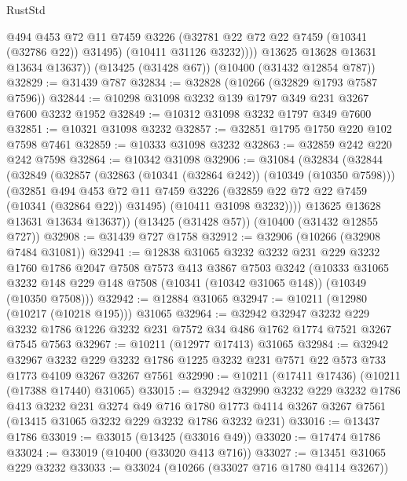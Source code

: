 \begin{lexlean}{RustStd}
\begin{coremodule}
              @494
              @453
              @72
              @11
              @7459
              @3226
              (@32781 @22 @72 @22 @7459 (@10341 (@32786 @22)) @31495)
              (@10411 @31126 @3232))))
        @13625
        @13628
        @13631
        @13634
        @13637))
    (@13425 (@31428 @67))
    (@10400 (@31432 @12854 @787))
@32829 := @31439 @787
@32834 := @32828 (@10266 (@32829 @1793 @7587 @7596))
@32844 := @10298 @31098 @3232 @139 @1797 @349 @231 @3267 @7600 @3232 @1952
@32849 := @10312 @31098 @3232 @1797 @349 @7600
@32851 := @10321 @31098 @3232
@32857 := @32851 @1795 @1750 @220 @102 @7598 @7461
@32859 := @10333 @31098 @3232
@32863 := @32859 @242 @220 @242 @7598
@32864 := @10342 @31098
@32906 := @31084
    (@32834
      (@32844
        (@32849
          (@32857
            (@32863 (@10341 (@32864 @242)) (@10349 (@10350 @7598)))
            (@32851
              @494
              @453
              @72
              @11
              @7459
              @3226
              (@32859 @22 @72 @22 @7459 (@10341 (@32864 @22)) @31495)
              (@10411 @31098 @3232))))
        @13625
        @13628
        @13631
        @13634
        @13637))
    (@13425 (@31428 @57))
    (@10400 (@31432 @12855 @727))
@32908 := @31439 @727 @1758
@32912 := @32906 (@10266 (@32908 @7484 @31081))
@32941 := @12838
    @31065
    @3232
    @3232
    @231
    @229
    @3232
    @1760
    @1786
    @2047
    @7508
    @7573
    @413
    @3867
    @7503
    @3242
    (@10333 @31065 @3232 @148 @229 @148 @7508 (@10341 (@10342 @31065 @148)) (@10349 (@10350 @7508)))
@32942 := @12884 @31065
@32947 := @10211 (@12980 (@10217 (@10218 @195))) @31065
@32964 := @32942
    @32947
    @3232
    @229
    @3232
    @1786
    @1226
    @3232
    @231
    @7572
    @34
    @486
    @1762
    @1774
    @7521
    @3267
    @7545
    @7563
@32967 := @10211 (@12977 @17413) @31065
@32984 := @32942
    @32967
    @3232
    @229
    @3232
    @1786
    @1225
    @3232
    @231
    @7571
    @22
    @573
    @733
    @1773
    @4109
    @3267
    @3267
    @7561
@32990 := @10211 (@17411 @17436) (@10211 (@17388 @17440) @31065)
@33015 := @32942
    @32990
    @3232
    @229
    @3232
    @1786
    @413
    @3232
    @231
    @3274
    @49
    @716
    @1780
    @1773
    @4114
    @3267
    @3267
    @7561
    (@13415 @31065 @3232 @229 @3232 @1786 @3232 @231)
@33016 := @13437 @1786
@33019 := @33015 (@13425 (@33016 @49))
@33020 := @17474 @1786
@33024 := @33019 (@10400 (@33020 @413 @716))
@33027 := @13451 @31065 @229 @3232
@33033 := @33024 (@10266 (@33027 @716 @1780 @4114 @3267))

\end{coremodule}
\end{lexlean}

